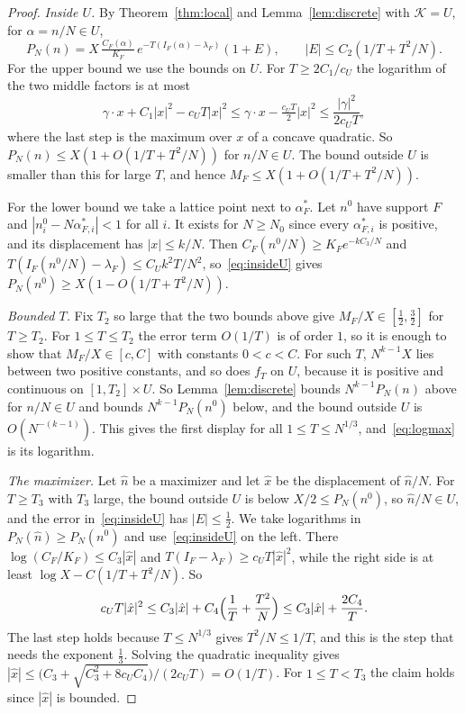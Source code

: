 \begin{proof}
\emph{Inside $U$.} By Theorem~\ref{thm:local} and Lemma~\ref{lem:discrete} with $\mathcal K=U$,
for $\alpha=n/N\in U$,
\begin{equation}\label{eq:insideU}
P_N(n)=X\,\tfrac{C_F(\alpha)}{K_F}\,e^{-T(I_F(\alpha)-\lambda_F)}(1+E),
\qquad|E|\le C_2(1/T+T^2/N).
\end{equation}
For the upper bound we use the bounds on $U$. For $T\ge2C_1/c_U$ the logarithm of the two middle
factors is at most
\[
\gamma\cdot x+C_1|x|^2-c_UT|x|^2\le\gamma\cdot x-\tfrac{c_UT}2|x|^2\le\frac{|\gamma|^2}{2c_UT},
\]
where the last step is the maximum over $x$ of a concave quadratic. So
$P_N(n)\le X(1+O(1/T+T^2/N))$ for $n/N\in U$. The bound outside $U$ is smaller than this for
large $T$, and hence $M_F\le X(1+O(1/T+T^2/N))$.

For the lower bound we take a lattice point next to $\alpha^*_F$. Let $n^0$ have support $F$ and
$|n^0_i-N\alpha^*_{F,i}|<1$ for all $i$. It exists for $N\ge N_0$ since every $\alpha^*_{F,i}$ is
positive, and its displacement has $|x|\le k/N$. Then $C_F(n^0/N)\ge K_Fe^{-kC_3/N}$ and
$T(I_F(n^0/N)-\lambda_F)\le C_Uk^2T/N^2$, so~\eqref{eq:insideU} gives
$P_N(n^0)\ge X(1-O(1/T+T^2/N))$.

\emph{Bounded $T$.} Fix $T_2$ so large that the two bounds above give
$M_F/X\in[\frac12,\frac32]$ for $T\ge T_2$. For $1\le T\le T_2$ the error term $O(1/T)$ is of
order $1$, so it is enough to show that $M_F/X\in[c,C]$ with constants $0<c<C$. For such $T$,
$N^{k-1}X$ lies between two positive constants, and so does $f_T$ on $U$, because it is positive
and continuous on $[1,T_2]\times U$. So Lemma~\ref{lem:discrete} bounds $N^{k-1}P_N(n)$ above for
$n/N\in U$ and bounds $N^{k-1}P_N(n^0)$ below, and the bound outside $U$ is $O(N^{-(k-1)})$.
This gives the first display for all $1\le T\le N^{1/3}$, and~\eqref{eq:logmax} is its logarithm.

\emph{The maximizer.} Let $\hat n$ be a maximizer and let $\hat x$ be the displacement of
$\hat n/N$. For $T\ge T_3$ with $T_3$ large, the bound outside $U$ is below
$X/2\le P_N(n^0)$, so $\hat n/N\in U$, and the error in~\eqref{eq:insideU} has $|E|\le\frac12$.
We take logarithms in $P_N(\hat n)\ge P_N(n^0)$ and use~\eqref{eq:insideU} on the left. There
$\log(C_F/K_F)\le C_3|\hat x|$ and $T(I_F-\lambda_F)\ge c_UT|\hat x|^2$, while the right side is
at least $\log X-C(1/T+T^2/N)$. So
\[
c_UT|\hat x|^2\le C_3|\hat x|+C_4\Bigl(\frac1T+\frac{T^2}N\Bigr)\le C_3|\hat x|+\frac{2C_4}T .
\]
The last step holds because $T\le N^{1/3}$ gives $T^2/N\le1/T$, and this is the step that needs
the exponent $\frac13$. Solving the quadratic inequality gives
$|\hat x|\le\bigl(C_3+\sqrt{C_3^2+8c_UC_4}\bigr)/(2c_UT)=O(1/T)$. For $1\le T<T_3$ the claim
holds since $|\hat x|$ is bounded.
\end{proof}

